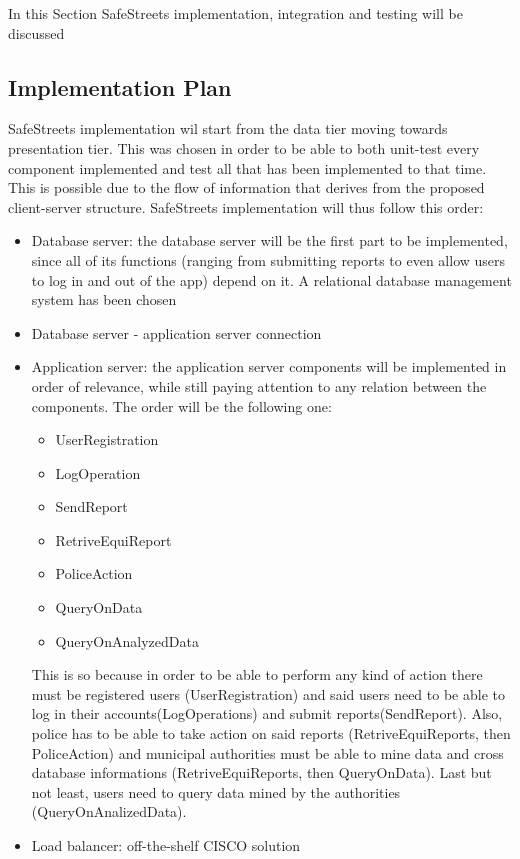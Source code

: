 In this Section SafeStreets implementation, integration and testing will be discussed

\subsection{Implementation Plan}
SafeStreets implementation wil start from the data tier moving towards presentation tier. This was chosen in order to be able to both unit-test every component implemented and test all that has been implemented to that time. This is possible due to the flow of information that derives from the proposed client-server structure.\newline
SafeStreets implementation will thus follow this order:
\begin{itemize}
	\item Database server: the database server will be the first part to be implemented, since all of its functions (ranging from submitting reports to even allow users to log in and out of the app) depend on it. A relational database management system has been chosen
	\item Database server - application server connection
	\item Application server: the application server components will be implemented in order of relevance, while still paying attention to any relation between the components. The order will be the following one:
	\begin{itemize}
		\item UserRegistration
		\item LogOperation
		\item SendReport
		\item RetriveEquiReport
		\item PoliceAction
		\item QueryOnData
		\item QueryOnAnalyzedData
	\end{itemize}
	This is so because in order to be able to perform any kind of action there must be registered users (UserRegistration) and said users need to be able to log in their accounts(LogOperations) and submit reports(SendReport). Also, police has to be able to take action on said reports (RetriveEquiReports, then PoliceAction)  and municipal authorities must be able to mine data and cross database informations (RetriveEquiReports, then QueryOnData). Last but not least, users need to query data mined by the authorities (QueryOnAnalizedData).
	\item Load balancer: off-the-shelf CISCO solution

\end{itemize}
